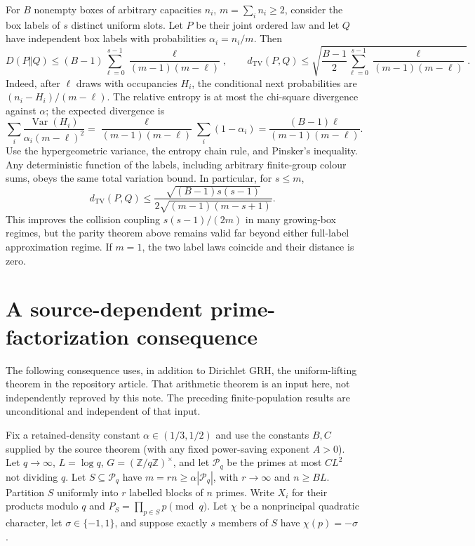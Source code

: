 \documentclass[11pt]{article}
\newcommand{\TV}{d_{\mathrm{TV}}}
\newcommand{\Var}{\operatorname{Var}}
\begin{document}
For $B$ nonempty boxes of arbitrary capacities $n_i$, $m=\sum_i n_i\ge2$,
consider the box labels of $s$ distinct uniform slots. Let $P$ be their
joint ordered law and let $Q$ have independent box labels with
probabilities $\alpha_i=n_i/m$. Then
\[
 D(P\Vert Q)\le(B-1)\sum_{\ell=0}^{s-1}
 \frac{\ell}{(m-1)(m-\ell)},\qquad
 \TV(P,Q)\le\sqrt{\frac{B-1}{2}
 \sum_{\ell=0}^{s-1}\frac{\ell}{(m-1)(m-\ell)}}.
\]
Indeed, after $\ell$ draws with occupancies $H_i$, the conditional next
probabilities are $(n_i-H_i)/(m-\ell)$. The relative entropy is at most
the chi-square divergence against $\alpha$; the expected divergence is
\[
 \sum_i\frac{\Var(H_i)}{\alpha_i(m-\ell)^2}
 =\frac{\ell}{(m-1)(m-\ell)}\sum_i(1-\alpha_i)
 =\frac{(B-1)\ell}{(m-1)(m-\ell)}.
\]
Use the hypergeometric variance, the entropy chain rule, and Pinsker's
inequality. Any deterministic function of the labels, including arbitrary
finite-group colour sums, obeys the same total variation bound.
In particular, for $s\le m$,
\[
 \TV(P,Q)\le\frac{\sqrt{(B-1)s(s-1)}}
 {2\sqrt{(m-1)(m-s+1)}}.
\]
This improves the collision coupling $s(s-1)/(2m)$ in many growing-box
regimes, but the parity theorem above remains valid far beyond either
full-label approximation regime.
If $m=1$, the two label laws coincide and their distance is zero.

\section{A source-dependent prime-factorization consequence}

The following consequence uses, in addition to Dirichlet GRH, the
uniform-lifting theorem  in the repository
article. That arithmetic theorem is an input here, not independently
reproved by this note. The preceding finite-population results are
unconditional and independent of that input.

Fix a retained-density constant $\alpha\in(1/3,1/2)$ and use the constants
$B,C$ supplied by the source theorem (with any fixed power-saving exponent
$A>0$). Let $q\to\infty$, $L=\log q$, $G=(\mathbb Z/q\mathbb Z)^\times$,
and let $\mathcal P_q$ be the primes at most $CL^2$ not dividing $q$.
Let $S\subseteq\mathcal P_q$ have $m=rn\ge\alpha|\mathcal P_q|$, with
$r\to\infty$ and $n\ge BL$. Partition $S$ uniformly into $r$ labelled
blocks of $n$ primes. Write $X_i$ for their products modulo $q$ and
$P_S=\prod_{p\in S}p\pmod q$.
Let $\chi$ be a nonprincipal quadratic character, let $\sigma\in\{-1,1\}$,
and suppose exactly $s$ members of $S$ have $\chi(p)=-\sigma$.
\end{document}
